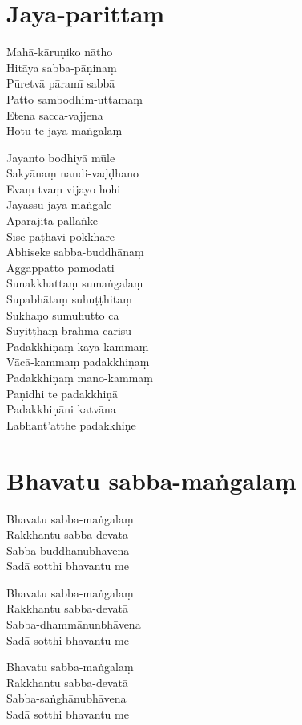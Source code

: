 \chapter{Jaya-parittaṃ}%

\begin{paritta}
Mahā-kāruṇiko nātho\\
Hitāya sabba-pāṇinaṃ\\
Pūretvā pāramī sabbā\\
Patto sambodhim-uttamaṃ\\
Etena sacca-vajjena\\
Hotu te jaya-maṅgalaṃ

Jayanto bodhiyā mūle\\
Sakyānaṃ nandi-vaḍḍhano\\
Evaṃ tvaṃ vijayo hohi\\
Jayassu jaya-maṅgale\\
Aparājita-pallaṅke\\
Sīse paṭhavi-pokkhare\\
Abhiseke sabba-buddhānaṃ\\
Aggappatto pamodati\\
Sunakkhattaṃ sumaṅgalaṃ\\
Supabhātaṃ suhuṭṭhitaṃ\\
Sukhaṇo sumuhutto ca\\
Suyiṭṭhaṃ brahma-cārisu\\
Padakkhiṇaṃ kāya-kammaṃ\\
Vācā-kammaṃ padakkhiṇaṃ\\
Padakkhiṇaṃ mano-kammaṃ\\
Paṇidhi te padakkhiṇā\\
Padakkhiṇāni katvāna\\
Labhant'atthe padakkhiṇe

\end{paritta}

\chapter{Bhavatu sabba-maṅgalaṃ}%

\begin{paritta}
Bhavatu sabba-maṅgalaṃ\\
Rakkhantu sabba-devatā\\
Sabba-buddhānubhāvena\\
Sadā sotthi bhavantu me

Bhavatu sabba-maṅgalaṃ\\
Rakkhantu sabba-devatā\\
Sabba-dhammānunbhāvena\\
Sadā sotthi bhavantu me

Bhavatu sabba-maṅgalaṃ\\
Rakkhantu sabba-devatā\\
Sabba-saṅghānubhāvena\\
Sadā sotthi bhavantu me
\end{paritta}


